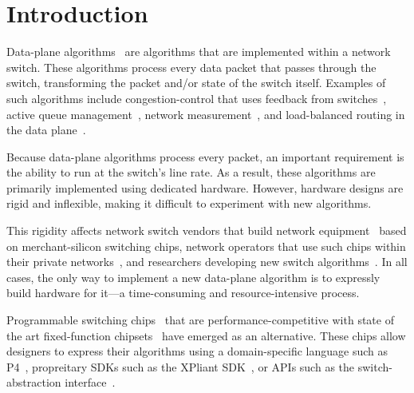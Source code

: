 \section{Introduction}
\label{s:intro}

Data-plane algorithms~\cite{cestan} are algorithms that are implemented within
a network switch. These algorithms process every data packet that passes
through the switch, transforming the packet and/or state of the switch itself.
Examples of such algorithms include congestion-control that uses feedback from
switches~\cite{xcp, rcp, pdq, dctcp}, active queue management~\cite{codel},
network measurement~\cite{opensketch, bitmap_george, elephant_george}, and
load-balanced routing in the data plane~\cite{conga}.

Because data-plane algorithms process every packet, an important requirement is
the ability to run at the switch's line rate.  As a result, these algorithms
are primarily implemented using dedicated hardware. However, hardware designs
are rigid and inflexible, making it difficult to experiment with new
algorithms.

This rigidity affects network switch vendors that build network
equipment~\cite{cisco_nexus, dell_force10, arista_7050} based on
merchant-silicon switching chips,  network operators that use such chips within
their private networks~\cite{jupiter,amazon,isp}, and researchers developing
new switch algorithms~\cite{xcp, codel, d3, detail, pdq}. In all cases, the
only way to implement a new data-plane algorithm is to expressly build hardware
for it---a time-consuming and resource-intensive process.

Programmable switching chips~\cite{flexpipe, xpliant, rmt} that are
performance-competitive with state of the art fixed-function
chipsets~\cite{trident, tomahawk, mellanox} have emerged as an alternative.
These chips allow designers to express their algorithms using a domain-specific
language such as P4~\cite{p4}, propreitary SDKs such as the XPliant SDK~\cite{xpliant_sdk},
or APIs such as the switch-abstraction interface~\cite{sai}.


